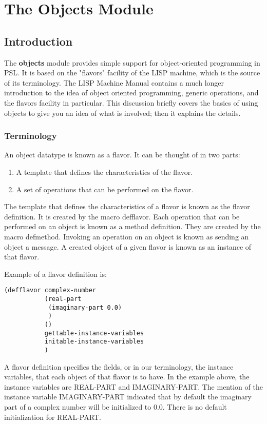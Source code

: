 \chapter*{The Objects Module}

\section{Introduction}

The {\bf objects} module provides simple support for object-oriented
programming in PSL. It is based on the "flavors" facility of
the LISP machine, which is the source of its terminology. The
LISP  Machine  Manual contains a much longer introduction to the
idea of object oriented programming, generic operations, and the
flavors facility in particular.  This discussion briefly  covers
the  basics  of  using  objects  to  give you an idea of what is
involved; then it explains the details.

\subsection{Terminology}

  An object datatype is known as a flavor.  It can be thought of
in two parts:


\begin{enumerate}
\item  A template that defines the characteristics of the flavor.
\item  A set of operations that can be performed on the flavor.
\end{enumerate}
The template that defines the characteristics  of  a  flavor  is
known  as  the  flavor  definition.   It is created by the macro
defflavor.  Each operation that can be performed on an object is
known as a method definition.  They are  created  by  the  macro
defmethod.   Invoking  an  operation  on  an  object is known as
sending an object a message.  A created object of a given flavor
is known as an instance of that flavor.

  Example of a flavor definition is:

\begin{verbatim}
(defflavor complex-number
           (real-part
            (imaginary-part 0.0)
            )
           ()
           gettable-instance-variables
           initable-instance-variables
           )
\end{verbatim}

A flavor definition specifies the fields, or in our terminology,
the  instance variables, that each object of that flavor  is  to
have.    In  the  example  above,  the  instance  variables  are
REAL-PART and  IMAGINARY-PART.   The  mention  of  the  instance
variable  IMAGINARY-PART indicated that by default the imaginary
part of a complex number will be initialized to 0.0. There is no
default initialization for REAL-PART.


